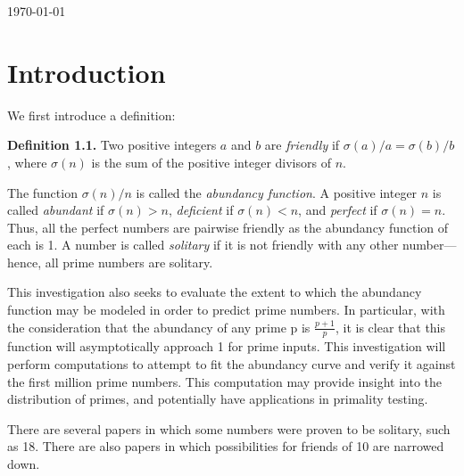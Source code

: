 \documentclass[11pt]{article}
\begin{document}
\begin{titlepage}
{\large \today}\\[3cm] 


 

\vfill 

\end{titlepage}

\tableofcontents
\newpage
\newpage

\section{Introduction}
We first introduce a definition:

\textbf{Definition 1.1.} Two positive integers $a$ and $b$ are \textit{friendly} if $\sigma(a)/a = \sigma(b)/b$, where $\sigma(n)$ is the sum of the positive integer divisors of $n$.

The function $\sigma(n)/n$ is called the \textit{abundancy function}. A positive integer $n$ is called \textit{abundant} if $\sigma(n) > n$, \textit{deficient} if $\sigma(n) < n$, and \textit{perfect} if $\sigma(n) = n$. Thus, all the perfect numbers are pairwise friendly as the abundancy function of each is 1. A number is called \textit{solitary} if it is not friendly with any other number---hence, all prime numbers are solitary.

This investigation also seeks to evaluate the extent to which the abundancy function may be modeled in order to predict prime numbers. In particular, with the consideration that the abundancy of any prime p is $\frac{p+1}{p}$, it is clear that this function will asymptotically approach 1 for prime inputs. This investigation will perform computations to attempt to fit the abundancy curve and verify it against the first million prime numbers. This computation may provide insight into the distribution of primes, and potentially have applications in primality testing.

There are several papers in which some numbers were proven to be solitary, such as 18. There are also papers in which possibilities for friends of 10 are narrowed down.
$ $ \indent 
\end{document}
